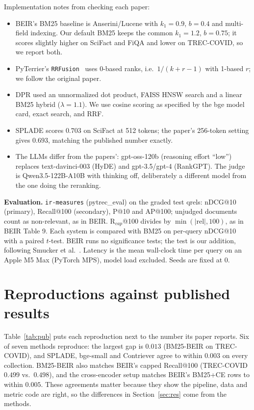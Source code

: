\documentclass[11pt]{article}
\begin{document}
\noindent Implementation notes from checking each paper:
\begin{itemize}
\item BEIR's BM25 baseline is Anserini/Lucene with $k_1{=}0.9$, $b{=}0.4$ and multi-field indexing.
  Our default BM25 keeps the common $k_1{=}1.2$, $b{=}0.75$; it scores slightly higher on SciFact and
  FiQA and lower on TREC-COVID, so we report both.
\item PyTerrier's \texttt{RRFusion}~\cite{macdonald2020pyterrier,pyterrierdocs} uses 0-based ranks,
  i.e.\ $1/(k+r-1)$ with 1-based $r$; we follow the original paper.
\item DPR used an unnormalized dot product, FAISS HNSW search and a linear BM25 hybrid
  ($\lambda{=}1.1$). We use cosine scoring as specified by the bge model card, exact search, and RRF.
\item SPLADE scores $0.703$ on SciFact at 512 tokens; the paper's 256-token setting gives $0.693$,
  matching the published number exactly.
\item The LLMs differ from the papers': gpt-oss-120b (reasoning effort ``low'') replaces
  text-davinci-003 (HyDE) and gpt-3.5/gpt-4 (RankGPT). The judge is Qwen3.5-122B-A10B with thinking off,
  deliberately a different model from the one doing the reranking.
\end{itemize}

\textbf{Evaluation.} \texttt{ir-measures} (pytrec\_eval) on the graded test qrels: nDCG@10
(primary), Recall@100 (secondary), P@10 and AP@100; unjudged documents count as non-relevant, as in
BEIR. R$_{cap}$@100 divides by $\min(|\mathrm{rel}|,100)$, as in BEIR Table 9. Each system is compared
with BM25 on per-query nDCG@10 with a paired $t$-test. BEIR runs no significance tests; the test is
our addition, following Smucker et al.~\cite{smucker2007significance}. Latency is the mean
wall-clock time per query on an Apple M5 Max (PyTorch MPS), model load excluded. Seeds are fixed at 0.

\section{Reproductions against published results}
Table~\ref{tab:pub} puts each reproduction next to the number its paper reports. Six of seven
methods reproduce: the largest gap is $0.013$ (BM25-BEIR on TREC-COVID), and SPLADE, bge-small and
Contriever agree to within $0.003$ on every collection. BM25-BEIR also matches BEIR's capped
Recall@100 (TREC-COVID $0.499$ vs.\ $0.498$), and the cross-encoder setup matches BEIR's BM25+CE rows
to within $0.005$. These agreements matter because they show the pipeline, data and metric code are
right, so the differences in Section~\ref{sec:res} come from the methods.
\end{document}
